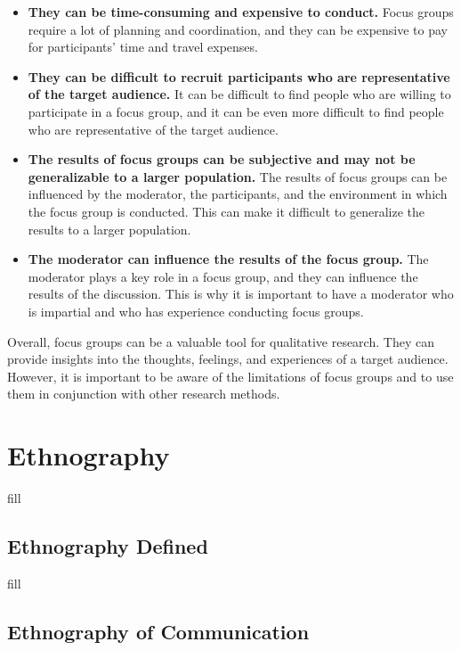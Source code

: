 \documentclass[
  b5paper]{book}
\begin{document}
\begin{itemize}
\item
  \textbf{They can be time-consuming and expensive to conduct.} Focus groups require a lot of planning and coordination, and they can be expensive to pay for participants' time and travel expenses.
\item
  \textbf{They can be difficult to recruit participants who are representative of the target audience.} It can be difficult to find people who are willing to participate in a focus group, and it can be even more difficult to find people who are representative of the target audience.
\item
  \textbf{The results of focus groups can be subjective and may not be generalizable to a larger population.} The results of focus groups can be influenced by the moderator, the participants, and the environment in which the focus group is conducted. This can make it difficult to generalize the results to a larger population.
\item
  \textbf{The moderator can influence the results of the focus group.} The moderator plays a key role in a focus group, and they can influence the results of the discussion. This is why it is important to have a moderator who is impartial and who has experience conducting focus groups.
\end{itemize}

Overall, focus groups can be a valuable tool for qualitative research. They can provide insights into the thoughts, feelings, and experiences of a target audience. However, it is important to be aware of the limitations of focus groups and to use them in conjunction with other research methods.

\hypertarget{ethnography-1}{%
\chapter{Ethnography}\label{ethnography-1}}

fill

\hypertarget{ethnography-defined}{%
\section{Ethnography Defined}\label{ethnography-defined}}

fill

\hypertarget{ethnography-of-communication}{%
\section{Ethnography of Communication}\label{ethnography-of-communication}}
\end{document}
